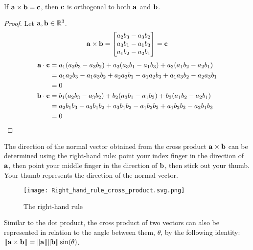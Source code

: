 \documentclass[../main.tex]{subfiles}
\begin{document}
\begin{theorem}
	If $\mathbf{a}\times\mathbf{b}=\mathbf{c}$, then
	$\mathbf{c}$ is orthogonal to both $\mathbf{a}$ and $\mathbf{b}$.
\end{theorem}

\begin{proof}
	Let $\mathbf{a}, \mathbf{b} \in \mathbb{R}^3$.
	\[\mathbf{a}\times\mathbf{b} =\begin{bmatrix}a_2b_3-a_3b_2\\a_3b_1-a_1b_3\\a_1b_2-a_2b_1\end{bmatrix}=\mathbf{c}\]
	\begin{align*}
		\mathbf{a}\cdot\mathbf{c} & =a_1(a_2b_3-a_3b_2)+a_2(a_3b_1-a_1b_3)+a_3(a_1b_2-a_2b_1)    \\
		                      & =a_1a_2b_3-a_1a_3b_2+a_2a_3b_1-a_1a_2b_3+a_1a_3b_2-a_2a_3b_1 \\
		                      & =0                                                           \\
		\mathbf{b}\cdot\mathbf{c} & =b_1(a_2b_3-a_3b_2)+b_2(a_3b_1-a_1b_3)+b_3(a_1b_2-a_2b_1)    \\
		                      & =a_2b_1b_3-a_3b_1b_2+a_3b_1b_2-a_1b_2b_3+a_1b_2b_3-a_2b_1b_3 \\
		                      & =0
	\end{align*}
\end{proof}

The direction of the normal vector obtained from the cross product $\mathbf{a}\times\mathbf{b}$
can be determined using the right-hand rule: point your index finger in
the direction of $\mathbf{a}$, then point your middle finger in the direction of
$\mathbf{b}$, then stick out your thumb. Your thumb represents the direction of the
normal vector.

\begin{figure}[H]
	\centering
	\texttt{[image: Right\_hand\_rule\_cross\_product.svg.png]}
	\caption{The right-hand rule}
\end{figure}

Similar to the dot product, the cross product of two vectors can also
be represented in relation to the angle between them, $\theta$,
by the following identity: $\|\mathbf{a}\times\mathbf{b}\|=\|\mathbf{a}\|\|\mathbf{b}\|\sin (\theta)$.
\end{document}
